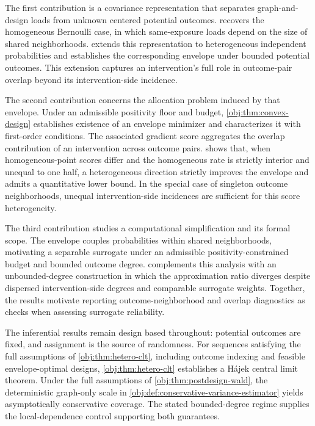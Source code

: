 The first contribution is a covariance representation that separates graph-and-design loads from unknown centered potential outcomes.  recovers the homogeneous Bernoulli case, in which same-exposure loads depend on the size of shared neighborhoods.  extends this representation to heterogeneous independent probabilities and establishes the corresponding envelope under bounded potential outcomes. This extension captures an intervention's full role in outcome-pair overlap beyond its intervention-side incidence.

The second contribution concerns the allocation problem induced by that envelope. Under an admissible positivity floor and budget, \cref{obj:thm:convex-design} establishes existence of an envelope minimizer and characterizes it with first-order conditions. The associated gradient score aggregates the overlap contribution of an intervention across outcome pairs.  shows that, when homogeneous-point scores differ and the homogeneous rate is strictly interior and unequal to one half, a heterogeneous direction strictly improves the envelope and admits a quantitative lower bound. In the special case of singleton outcome neighborhoods, unequal intervention-side incidences are sufficient for this score heterogeneity.

The third contribution studies a computational simplification and its formal scope. The envelope couples probabilities within shared neighborhoods, motivating a separable surrogate under an admissible positivity-constrained budget and bounded outcome degree.  complements this analysis with an unbounded-degree construction in which the approximation ratio diverges despite dispersed intervention-side degrees and comparable surrogate weights. Together, the results motivate reporting outcome-neighborhood and overlap diagnostics as checks when assessing surrogate reliability.

The inferential results remain design based throughout: potential outcomes are fixed, and assignment is the source of randomness. For sequences satisfying the full assumptions of \cref{obj:thm:hetero-clt}, including outcome indexing and feasible envelope-optimal designs, \cref{obj:thm:hetero-clt} establishes a Hájek central limit theorem. Under the full assumptions of \cref{obj:thm:postdesign-wald}, the deterministic graph-only scale in \cref{obj:def:conservative-variance-estimator} yields asymptotically conservative coverage. The stated bounded-degree regime supplies the local-dependence control supporting both guarantees.

